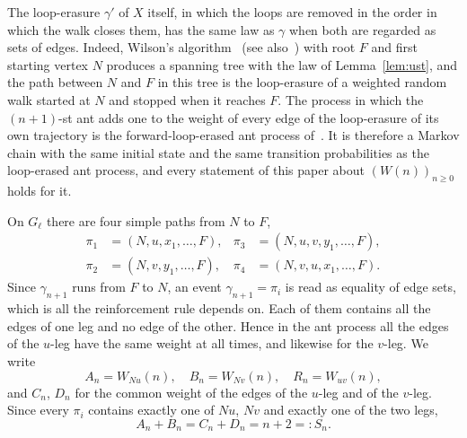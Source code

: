 \documentclass[11pt]{amsart}
\theoremstyle{remark}
\begin{document}
The loop-erasure $\gamma'$ of $X$ itself, in which the loops are removed in the order in which the walk closes them,
has the same law as $\gamma$ when both are regarded as sets of edges. Indeed, Wilson's algorithm~\cite{Wilson} (see
also~\cite[Chapter~4]{LP}) with root $F$ and first starting vertex $N$ produces a spanning tree with the law of
Lemma~\ref{lem:ust}, and the path between $N$ and $F$ in this tree is the loop-erasure of a weighted random walk
started at $N$ and stopped when it reaches $F$. The process in which the $(n+1)$-st ant adds one to the weight of
every edge of the loop-erasure of its own trajectory is the forward-loop-erased ant process of~\cite{AM}. It is
therefore a Markov chain with the same initial state and the same transition probabilities as the loop-erased ant
process, and every statement of this paper about $(W(n))_{n\ge0}$ holds for it.

On $G_\ell$ there are four simple paths from $N$ to $F$,
\begin{align*}
\pi_1&=(N,u,x_1,\dots,F), & \pi_3&=(N,u,v,y_1,\dots,F),\\
\pi_2&=(N,v,y_1,\dots,F), & \pi_4&=(N,v,u,x_1,\dots,F).
\end{align*}
Since $\gamma_{n+1}$ runs from $F$ to $N$, an event $\gamma_{n+1}=\pi_i$ is read as equality of edge sets, which is all
the reinforcement rule depends on.
Each of them contains all the edges of one leg and no edge of the other. Hence in the ant process all the edges of the
$u$-leg have the same weight at all times, and likewise for the $v$-leg. We write
\[
A_n=W_{Nu}(n),\quad B_n=W_{Nv}(n),\quad R_n=W_{uv}(n),
\]
and $C_n$, $D_n$ for the common weight of the edges of the $u$-leg and of the $v$-leg. Since every $\pi_i$ contains
exactly one of $Nu$, $Nv$ and exactly one of the two legs,
\begin{equation}\label{eq:sum}
A_n+B_n=C_n+D_n=n+2=:S_n .
\end{equation}
\end{document}
